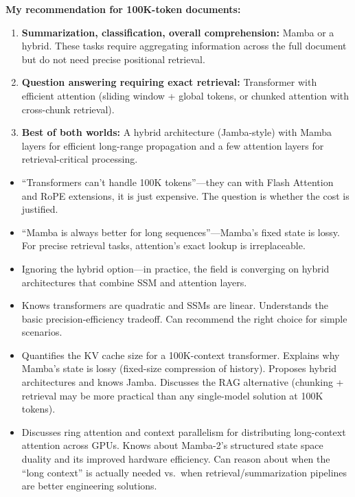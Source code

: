 \begin{interviewq}
\textbf{My recommendation for 100K-token documents:}
\begin{enumerate}
    \item \textbf{Summarization, classification, overall comprehension:} Mamba or a hybrid. These tasks require aggregating information across the full document but do not need precise positional retrieval.
    \item \textbf{Question answering requiring exact retrieval:} Transformer with efficient attention (sliding window + global tokens, or chunked attention with cross-chunk retrieval).
    \item \textbf{Best of both worlds:} A hybrid architecture (Jamba-style) with Mamba layers for efficient long-range propagation and a few attention layers for retrieval-critical processing.
\end{enumerate}

\redflags
\begin{itemize}
    \item ``Transformers can't handle 100K tokens''---they can with Flash Attention and RoPE extensions, it is just expensive. The question is whether the cost is justified.
    \item ``Mamba is always better for long sequences''---Mamba's fixed state is lossy. For precise retrieval tasks, attention's exact lookup is irreplaceable.
    \item Ignoring the hybrid option---in practice, the field is converging on hybrid architectures that combine SSM and attention layers.
\end{itemize}


\goodgreat
\begin{itemize}
    \item {} Knows transformers are quadratic and SSMs are linear. Understands the basic precision-efficiency tradeoff. Can recommend the right choice for simple scenarios.
    \item {} Quantifies the KV cache size for a 100K-context transformer. Explains why Mamba's state is lossy (fixed-size compression of history). Proposes hybrid architectures and knows Jamba. Discusses the RAG alternative (chunking + retrieval may be more practical than any single-model solution at 100K tokens).
    \item {} Discusses ring attention and context parallelism for distributing long-context attention across GPUs. Knows about Mamba-2's structured state space duality and its improved hardware efficiency. Can reason about when the ``long context'' is actually needed vs.\ when retrieval/summarization pipelines are better engineering solutions.
\end{itemize}


\end{interviewq}
